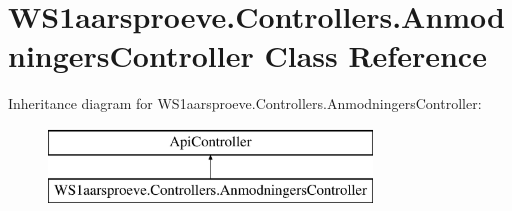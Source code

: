 \hypertarget{class_w_s1aarsproeve_1_1_controllers_1_1_anmodningers_controller}{}\section{W\+S1aarsproeve.\+Controllers.\+Anmodningers\+Controller Class Reference}
\label{class_w_s1aarsproeve_1_1_controllers_1_1_anmodningers_controller}
Inheritance diagram for W\+S1aarsproeve.\+Controllers.\+Anmodningers\+Controller\+:\begin{figure}[H]
\begin{center}
\leavevmode
\includegraphics[height=2.000000cm]{class_w_s1aarsproeve_1_1_controllers_1_1_anmodningers_controller}
\end{center}
\end{figure}
